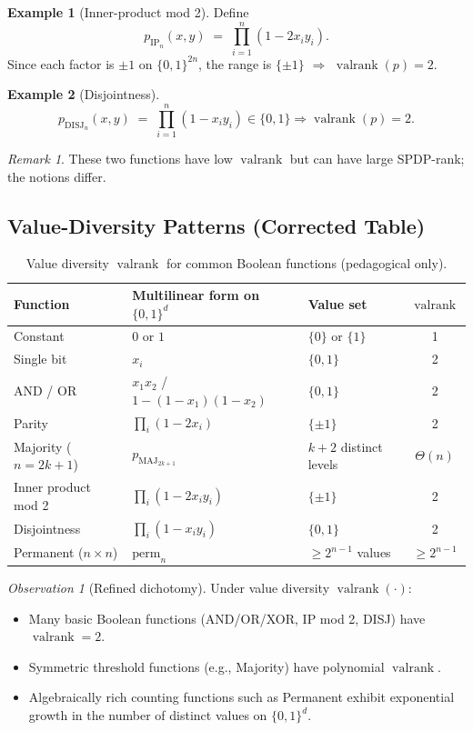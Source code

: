 \documentclass[12pt]{article}
\newcommand{\valrank}{\operatorname{valrank}}
\theoremstyle{definition}
\theoremstyle{definition}
\newtheorem{example}{Example}
\theoremstyle{remark}
\newtheorem{remark}{Remark}
\newtheorem{observation}[theorem]{Observation}
\theoremstyle{remark}
\begin{document}
\begin{example}[Inner-product mod 2]
Define
\[
p_{\mathrm{IP}_n}(x,y) \;=\; \prod_{i=1}^n (1 - 2x_i y_i).
\]
Since each factor is $\pm 1$ on $\{0,1\}^{2n}$, the range is $\{\pm 1\}$ $\Rightarrow$ $\valrank(p) = 2$.
\end{example}

\begin{example}[Disjointness]
\[
p_{\mathrm{DISJ}_n}(x,y) \;=\; \prod_{i=1}^n (1 - x_i y_i) \in \{0,1\} \Rightarrow \valrank(p) = 2.
\]
\end{example}

\begin{remark}
These two functions have low $\valrank$ but can have large SPDP-rank; the notions differ.
\end{remark}

\subsection{Value-Diversity Patterns (Corrected Table)}

\begin{table}[h]
\centering
\begin{tabular}{lllc}
\toprule
\textbf{Function} & \textbf{Multilinear form on $\{0,1\}^d$} & \textbf{Value set} & $\valrank$ \\
\midrule
Constant & $0$ or $1$ & $\{0\}$ or $\{1\}$ & 1 \\
Single bit & $x_i$ & $\{0,1\}$ & 2 \\
AND / OR & $x_1 x_2$ / $1-(1-x_1)(1-x_2)$ & $\{0,1\}$ & 2 \\
Parity & $\prod_i (1-2x_i)$ & $\{\pm 1\}$ & 2 \\
Majority ($n=2k+1$) & $p_{\mathrm{MAJ}_{2k+1}}$ & $k+2$ distinct levels & $\Theta(n)$ \\
Inner product mod 2 & $\prod_i (1-2x_i y_i)$ & $\{\pm 1\}$ & 2 \\
Disjointness & $\prod_i (1-x_i y_i)$ & $\{0,1\}$ & 2 \\
Permanent ($n \times n$) & $\mathrm{perm}_n$ & $\geq 2^{n-1}$ values & $\geq 2^{n-1}$ \\
\bottomrule
\end{tabular}
\caption{Value diversity $\valrank$ for common Boolean functions (pedagogical only).}
\label{tab:value-rank}
\end{table}

\begin{observation}[Refined dichotomy]
\label{obs:rank-dichotomy}
Under value diversity $\valrank(\cdot)$:
\begin{itemize}
\item Many basic Boolean functions (AND/OR/XOR, IP mod 2, DISJ) have $\valrank = 2$.
\item Symmetric threshold functions (e.g., Majority) have polynomial $\valrank$.
\item Algebraically rich counting functions such as Permanent exhibit exponential growth in the number of distinct values on $\{0,1\}^d$.
\end{itemize}
\end{observation}
\end{document}
